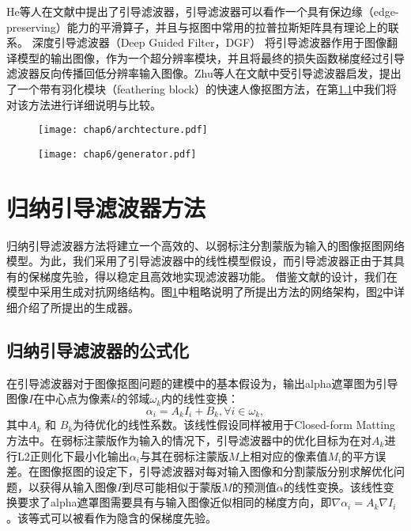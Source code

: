 He等人在文献\parencite{he2010guided}中提出了引导滤波器，引导滤波器可以看作一个具有保边缘（edge-preserving）能力的平滑算子，并且与抠图中常用的拉普拉斯矩阵具有理论上的联系。
深度引导滤波器（Deep Guided Filter，DGF）\cite{wu2018fast} 将引导滤波器作用于图像翻译模型的输出图像，作为一个超分辨率模块，并且将最终的损失函数梯度经过引导滤波器反向传播回低分辨率输入图像。Zhu等人在文献\parencite{zhu2017fast}中受引导滤波器启发，提出了一个带有羽化模块（feathering block）的快速人像抠图方法，在第\ref{sec6:igf}中我们将对该方法进行详细说明与比较。

\begin{figure}[t]
	\centering
	\texttt{[image: chap6/archtecture.pdf]}
	\label{fig6:archtecture}
\end{figure}
\begin{figure}[t]
	\centering
	\texttt{[image: chap6/generator.pdf]}
	\label{fig6:generator}
\end{figure}

\section{归纳引导滤波器方法}
归纳引导滤波器方法将建立一个高效的、以弱标注分割蒙版为输入的图像抠图网络模型。为此，我们采用了引导滤波器\cite{he2010guided}中的线性模型假设，而引导滤波器正由于其具有的保梯度先验，得以稳定且高效地实现滤波器功能。
借鉴文献\parencite{lutz2018alphagan}的设计，我们在模型中采用生成对抗网络\cite{goodfellow2014generative}结构。图\ref{fig6:archtecture}中粗略说明了所提出方法的网络架构，图\ref{fig6:generator}中详细介绍了所提出的生成器。

\subsection{归纳引导滤波器的公式化}
\label{sec6:igf}
在引导滤波器\cite{he2010guided}对于图像抠图问题的建模中的基本假设为，输出alpha遮罩图为引导图像$I$在中心点为像素$k$的邻域$\omega_k$内的线性变换：
\begin{equation}
\alpha_i = A_{k}I_{i} + B_{k}, \forall i \in \omega_k,
\end{equation}
其中$ A_{k} $ 和 $ B_{k} $为待优化的线性系数。该线性假设同样被用于Closed-form Matting\cite{levin2008closed}方法中。在弱标注蒙版作为输入的情况下，引导滤波器中的优化目标为在对$A_{k}$进行L2正则化下最小化输出$\alpha_i$与其在弱标注蒙版$ M $上相对应的像素值$M_i$的平方误差。在图像抠图的设定下，引导滤波器对每对输入图像和分割蒙版分别求解优化问题，以获得从输入图像$I$到尽可能相似于蒙版$M$的预测值$\alpha$的线性变换。该线性变换要求了alpha遮罩图需要具有与输入图像近似相同的梯度方向，即$ \nabla \alpha_i=A_k \nabla I_i $。该等式可以被看作为隐含的保梯度先验。

